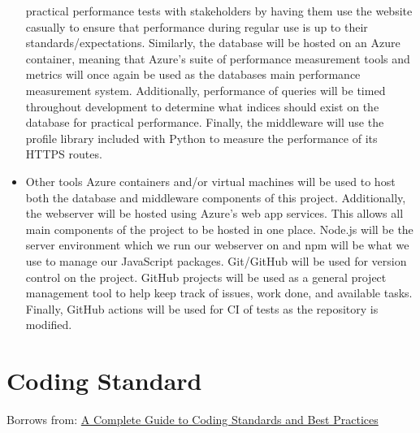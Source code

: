 \documentclass{article}
\begin{document}
\begin{itemize}
practical performance tests with stakeholders by having them use the website 
casually to ensure that performance during regular use is up to their
standards/expectations.
\subitem Similarly, the database will be hosted on an Azure container, meaning 
that Azure's suite of performance measurement tools and metrics will once again 
be used as the databases main performance measurement system. Additionally, 
performance of queries will be timed throughout development to determine what 
indices should exist on the database for practical performance.
\subitem Finally, the middleware will use the profile library included with 
Python to measure the performance of its HTTPS routes.
\item Other tools
\subitem Azure containers and/or virtual machines will be used to host both the 
database and middleware components of this project. Additionally, the webserver 
will be hosted using Azure's web app services. This allows all main components 
of the project to be hosted in one place.
\subitem Node.js will be the server environment which we run our webserver on 
and npm will be what we use to manage our JavaScript 
packages.
\subitem Git/GitHub will be used for version control on the project. GitHub 
projects will be used as a general project management tool to help keep 
track of issues, work done, and available tasks. Finally, GitHub actions will 
be used for CI of tests as the repository is modified.
\end{itemize}

\section{Coding Standard}

Borrows from: \newline
\href{https://www.lambdatest.com/learning-hub/coding-standards}{A Complete Guide to Coding Standards and Best Practices}
\end{document}
